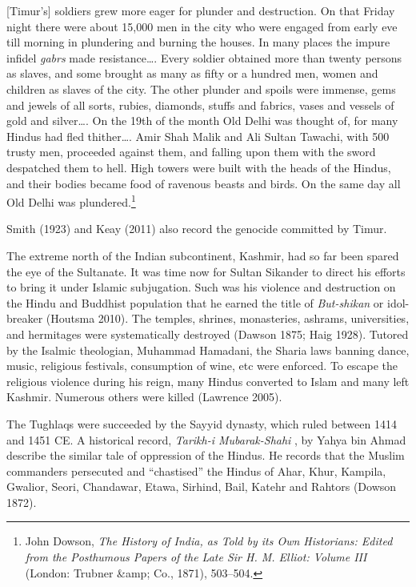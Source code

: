 [Timur's] soldiers grew more eager for plunder and destruction. On that Friday night there were about 15,000 men in the city who were engaged from early eve till morning in plundering and burning the houses. In many places the impure infidel \textit{gabrs} made resistance…. Every soldier obtained more than twenty persons as slaves, and some brought as many as fifty or a hundred men, women and children as slaves of the city. The other plunder and spoils were immense, gems and jewels of all sorts, rubies, diamonds, stuffs and fabrics, vases and vessels of gold and silver…. On the 19th of the month Old Delhi was thought of, for many Hindus had fled thither…. Amir Shah Malik and Ali Sultan Tawachi, with 500 trusty men, proceeded against them, and falling upon them with the sword despatched them to hell. High towers were built with the heads of the Hindus, and their bodies became food of ravenous beasts and birds. On the same day all Old Delhi was plundered.\footnote{John Dowson, \textit{The History of India, as Told by its Own Historians: Edited from the Posthumous Papers of the Late Sir H. M. Elliot: Volume III} (London: Trubner &amp; Co., 1871), 503--504.} 

Smith (1923) and Keay (2011) also record the genocide committed by Timur. 

The extreme north of the Indian subcontinent, Kashmir, had so far been spared the eye of the Sultanate. It was time now for Sultan Sikander to direct his efforts to bring it under Islamic subjugation. Such was his violence and destruction on the Hindu and Buddhist population that he earned the title of \textit{But-shikan} or idol-breaker (Houtsma 2010). The temples, shrines, monasteries, ashrams, universities, and hermitages were systematically destroyed (Dawson 1875; Haig 1928). Tutored by the Isalmic theologian, Muhammad Hamadani, the Sharia laws banning dance, music, religious festivals, consumption of wine, etc were enforced. To escape the religious violence during his reign, many Hindus converted to Islam and many left Kashmir. Numerous others were killed (Lawrence 2005).

The Tughlaqs were succeeded by the Sayyid dynasty, which ruled between 1414 and 1451 CE. A historical record, \textit{Tarikh-i Mubarak-Shahi} , by Yahya bin Ahmad describe the similar tale of oppression of the Hindus. He records that the Muslim commanders persecuted and “chastised” the Hindus of Ahar, Khur, Kampila, Gwalior, Seori, Chandawar, Etawa, Sirhind, Bail, Katehr and Rahtors (Dowson 1872).

